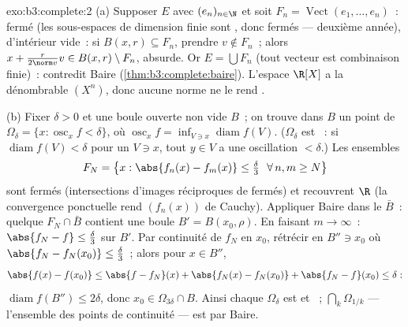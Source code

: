 \begin{solution}{exo:b3:complete:2}
(a) Supposer $E$  avec   $(e_n)_{n\in\N}$
et soit $F_n = \operatorname{Vect}(e_1, \dots, e_n)$~: fermé
(les sous-espaces de dimension finie sont , donc
fermés --- deuxième année), d'intérieur vide~: si $B(x, r)
\subseteq F_n$, prendre $v \notin F_n$~; alors $x +
\frac{r}{2\norm v}v \in B(x,r) \setminus F_n$, absurde. Or $E
= \bigcup F_n$ (tout vecteur est combinaison finie)~:
contredit Baire (\cref{thm:b3:complete:baire}). L'espace
$\R[X]$ a la  dénombrable $(X^n)$, donc aucune norme ne le
rend .

(b) Fixer $\delta > 0$ et une boule ouverte non vide $B$~; on
trouve dans $B$ un point de $\Omega_\delta = \{x :
\operatorname{osc}_xf < \delta\}$, où $\operatorname{osc}_xf
= \inf_{V \ni x}\operatorname{diam} f(V)$. ($\Omega_\delta$
est ~: si $\operatorname{diam}f(V) < \delta$ pour un
 $V \ni x$, tout $y \in V$ a une oscillation $<
\delta$.) Les ensembles
\[
F_N = \bigl\{x : \abs{f_n(x) - f_m(x)} \leq \tfrac\delta3\
\ \forall\, n, m \geq N \bigr\}
\]
sont fermés (intersections d'images réciproques de fermés) et
recouvrent $\R$ (la convergence ponctuelle rend $(f_n(x))$ de
Cauchy). Appliquer Baire dans le  $\bar B$~: quelque
$F_N \cap \bar B$ contient une boule $B' = B(x_0, \rho)$. En
faisant $m \to \infty$~: $\abs{f_N - f} \leq \frac\delta3$ sur
$B'$. Par continuité de $f_N$ en $x_0$, rétrécir en $B'' \ni
x_0$ où $\abs{f_N - f_N(x_0)} \leq \frac\delta3$~; alors pour
$x \in B''$,
\[
\abs{f(x) - f(x_0)} \leq \abs{f - f_N}(x) + \abs{f_N(x) -
f_N(x_0)} + \abs{f_N - f}(x_0) \leq \delta:
\]
$\operatorname{diam} f(B'') \leq 2\delta$, donc $x_0 \in
\Omega_{3\delta} \cap B$. Ainsi chaque $\Omega_\delta$ est
 et ~; $\bigcap_k\Omega_{1/k}$ --- l'ensemble des
points de continuité --- est \omterm{def:b3:topology:interior}{dense} par Baire.
\end{solution}

